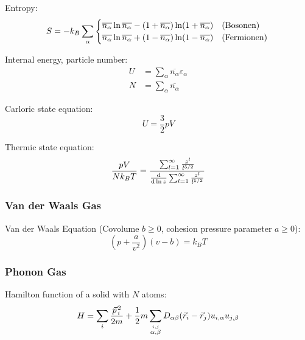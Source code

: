			\noindent
			Entropy:
			\begin{equation}
				S= -k_B\sum_\alpha
					\begin{cases}
						\overline{n_\alpha} \ln \overline{n_\alpha} - (1+\overline{n_\alpha}) \ln (1+\overline{n_\alpha}) & \text{(Bosonen)} \\
						\overline{n_\alpha} \ln \overline{n_\alpha} + (1-\overline{n_\alpha}) \ln (1-\overline{n_\alpha}) & \text{(Fermionen)}
					\end{cases} \\
			\end{equation}

			\noindent
			Internal energy, particle number:
			\begin{equation}
				\begin{aligned}
					U &= \sum_\alpha \overline{n_\alpha} \varepsilon_\alpha \\
					N &= \sum_\alpha \overline{n_\alpha}
				\end{aligned}
			\end{equation}

			\noindent
			Carloric state equation:
			\begin{equation}
				U=\frac{3}{2}pV
			\end{equation}

			\noindent
			Thermic state equation:
			\begin{equation}
				\frac{pV}{N k_B T} = \frac{\sum_{l=1}^{\infty}\frac{z^l}{l^{5/2}}}{\frac{\dd }{\dd \ln z}\sum_{l=1}^{\infty}\frac{z^l}{l^{5/2}}}
			\end{equation}

		\subsubsection{Van der Waals Gas}
			\noindent
			Van der Waals Equation (Covolume $b \ge 0$, cohesion pressure parameter $a \ge 0$):
			\begin{equation}
				\left( p+\frac{a}{v^2} \right) \left( v-b \right) = k_B T
			\end{equation}

		\subsubsection{Phonon Gas}
			\label{Sec:PhononGas}
			\noindent
			Hamilton function of a solid with $N$ atoms:
			\begin{equation}
				H=\sum_i \frac{\pvec{p}_i^2}{2m} + \frac{1}{2}m\sum_{\stackrel{i,j}{\alpha,\beta}} D_{\alpha\beta}(\vec{r}_i - \vec{r}_j)u_{i,\alpha}u_{j,\beta}
			\end{equation}


